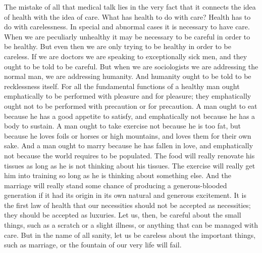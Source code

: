 The mistake of all that medical talk lies in the very fact that it connects the idea of health with the idea of care. What has health to do with care? Health has to do with carelessness. In special and abnormal cases it is necessary to have care. When we are peculiarly unhealthy it may be necessary to be careful in order to be healthy. But even then we are only trying to be healthy in order to be careless. If we are doctors we are speaking to exceptionally sick men, and they ought to be told to be careful. But when we are sociologists we are addressing the normal man, we are addressing humanity. And humanity ought to be told to be recklessness itself. For all the fundamental functions of a healthy man ought emphatically to be performed with pleasure and for pleasure; they emphatically ought not to be performed with precaution or for precaution. A man ought to eat because he has a good appetite to satisfy, and emphatically not because he has a body to sustain. A man ought to take exercise not because he is too fat, but because he loves foils or horses or high mountains, and loves them for their own sake. And a man ought to marry because he has fallen in love, and emphatically not because the world requires to be populated. The food will really renovate his tissues as long as he is not thinking about his tissues. The exercise will really get him into training so long as he is thinking about something else. And the marriage will really stand some chance of producing a generous-blooded generation if it had its origin in its own natural and generous excitement. It is the first law of health that our necessities should not be accepted as necessities; they should be accepted as luxuries. Let us, then, be careful about the small things, such as a scratch or a slight illness, or anything that can be managed with care. But in the name of all sanity, let us be careless about the important things, such as marriage, or the fountain of our very life will fail.

